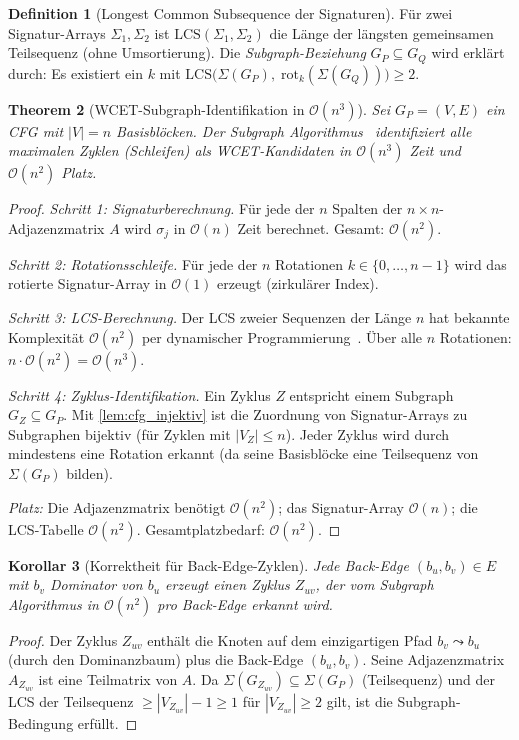 ﻿\documentclass[a4paper,12pt]{article}
\theoremstyle{plain}
\newtheorem{theorem}{Theorem}[section]
\newtheorem{corollary}[theorem]{Korollar}
\theoremstyle{definition}
\newtheorem{definition}[theorem]{Definition}
\theoremstyle{remark}
\begin{document}
\begin{definition}[Longest Common Subsequence der Signaturen]\label{def:lcs}
Für zwei Signatur-Arrays $\Sigma_1, \Sigma_2$ ist
$\mathrm{LCS}(\Sigma_1, \Sigma_2)$ die Länge der längsten gemeinsamen
Teilsequenz (ohne Umsortierung). Die \emph{Subgraph-Beziehung}
$G_P \subseteq G_Q$ wird erklärt durch:
Es existiert ein $k$ mit
$\mathrm{LCS}\!\bigl(\Sigma(G_P),\; \mathrm{rot}_k(\Sigma(G_Q))\bigr) \geq 2$.
\end{definition}

\begin{theorem}[WCET-Subgraph-Identifikation in $\mathcal{O}(n^3)$]
\label{thm:wcet_complexity}
Sei $G_P = (V, E)$ ein CFG mit $|V| = n$ Basisblöcken.
Der Subgraph Algorithmus~\cite{epp2026c} identifiziert alle
maximalen Zyklen (Schleifen) als WCET-Kandidaten in
$\mathcal{O}(n^3)$ Zeit und $\mathcal{O}(n^2)$ Platz.
\end{theorem}
\begin{proof}
\textit{Schritt 1: Signaturberechnung.}
Für jede der $n$ Spalten der $n \times n$-Adjazenzmatrix $A$ wird
$\sigma_j$ in $\mathcal{O}(n)$ Zeit berechnet. Gesamt:
$\mathcal{O}(n^2)$.

\textit{Schritt 2: Rotationsschleife.}
Für jede der $n$ Rotationen $k \in \{0,\ldots,n-1\}$ wird das
rotierte Signatur-Array in $\mathcal{O}(1)$ erzeugt (zirkulärer Index).

\textit{Schritt 3: LCS-Berechnung.}
Der LCS zweier Sequenzen der Länge $n$ hat bekannte Komplexität
$\mathcal{O}(n^2)$ per dynamischer Programmierung~\cite{cormen2022}.
Über alle $n$ Rotationen: $n \cdot \mathcal{O}(n^2) = \mathcal{O}(n^3)$.

\textit{Schritt 4: Zyklus-Identifikation.}
Ein Zyklus $Z$ entspricht einem Subgraph $G_Z \subseteq G_P$.
Mit \cref{lem:cfg_injektiv} ist die Zuordnung von Signatur-Arrays
zu Subgraphen bijektiv (für Zyklen mit $|V_Z| \leq n$).
Jeder Zyklus wird durch mindestens eine Rotation erkannt
(da seine Basisblöcke eine Teilsequenz von $\Sigma(G_P)$ bilden).

\textit{Platz:} Die Adjazenzmatrix benötigt $\mathcal{O}(n^2)$;
das Signatur-Array $\mathcal{O}(n)$; die LCS-Tabelle $\mathcal{O}(n^2)$.
Gesamtplatzbedarf: $\mathcal{O}(n^2)$.
\end{proof}

\begin{corollary}[Korrektheit für Back-Edge-Zyklen]\label{cor:backedge}
Jede Back-Edge $(b_u, b_v) \in E$ mit $b_v$ Dominator von $b_u$
erzeugt einen Zyklus $Z_{uv}$, der vom Subgraph Algorithmus in
$\mathcal{O}(n^2)$ pro Back-Edge erkannt wird.
\end{corollary}
\begin{proof}
Der Zyklus $Z_{uv}$ enthält die Knoten auf dem einzigartigen
Pfad $b_v \leadsto b_u$ (durch den Dominanzbaum) plus die
Back-Edge $(b_u, b_v)$. Seine Adjazenzmatrix $A_{Z_{uv}}$
ist eine Teilmatrix von $A$. Da
$\Sigma(G_{Z_{uv}}) \subseteq \Sigma(G_P)$ (Teilsequenz)
und der LCS der Teilsequenz $\geq |V_{Z_{uv}}|-1 \geq 1$
für $|V_{Z_{uv}}| \geq 2$ gilt, ist die Subgraph-Bedingung erfüllt.
\end{proof}
\end{document}
